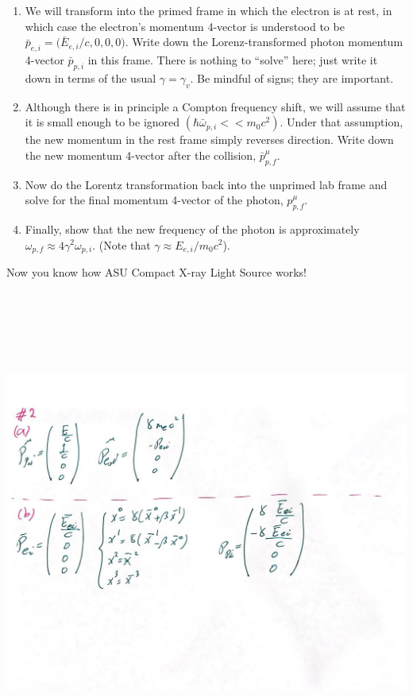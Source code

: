 \documentclass[fleqn]{article}
\begin{document}
\begin{enumerate}
\begin{enumerate}
      \item We will transform into the primed frame in which the electron is at rest, in which case the
      electron’s momentum 4-vector is understood to be $\bar{p}_{e,i}=\bigg( \bar{E}_{e,i}/c, 0,0,0 \bigg)$.
      Write down the Lorenz-transformed photon momentum 4-vector $\bar{p}_{p,i}$ in this frame. There is 
      nothing to “solve” here; just write it down in terms of the usual $\gamma =\gamma_v$. Be mindful of 
      signs; they are important.

      \item Although there is in principle a Compton frequency shift, we will assume that it is small enough
      to be ignored $(\hbar \bar{\omega}_{p,i} << m_0 c^2)$. Under that assumption, the new momentum in the rest frame
      simply reverses direction. Write down the new momentum 4-vector after the collision, $\bar{p}^{\mu}_{p,f}$.


      \item Now do the Lorentz transformation back into the unprimed lab frame and solve for the final
      momentum 4-vector of the photon, $p^{\mu}_{p,f}$.

      \item Finally, show that the new frequency of the photon is approximately $\omega_{p,f} \approx 4 \gamma^2 \omega_{p,i}$.
      (Note that $\gamma \approx E_{e,i}/m_0 c^2$).

    \end{enumerate}
    Now you know how ASU Compact X-ray Light Source works!

    \begin{center}
      \includegraphics[height=16cm, width=17cm]{2.JPG}
    \end{center}


\end{enumerate}
\end{document}
